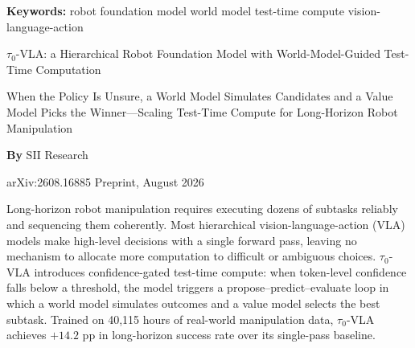 \documentclass[10pt,twocolumn]{article}
\begin{document}
\setlength{\parindent}{0pt}
\setlength{\parskip}{4pt}

{\small\color{keywordgray}\textbf{Keywords:}
  robot foundation model \textbullet{}
  world model \textbullet{}
  test-time compute \textbullet{}
  vision-language-action}\par\vspace{4pt}

{\LARGE\bfseries\raggedright
  $\tau_0$-VLA: a Hierarchical Robot Foundation
  Model with World-Model-Guided Test-Time
  Computation}\par\vspace{4pt}

{\large\itshape\raggedright
  When the Policy Is Unsure, a World Model Simulates Candidates
  and a Value Model Picks the Winner---Scaling Test-Time
  Compute for Long-Horizon Robot Manipulation}\par\vspace{6pt}

{\small\textbf{By} SII Research}\par\vspace{2pt}

{\small\color{keywordgray}arXiv:2608.16885 \textbullet{} Preprint, August 2026}
\par\vspace{2pt}\noindent{\color{rulered}\rule{\columnwidth}{0.6pt}}\vspace{6pt}

Long-horizon robot manipulation requires executing dozens of subtasks
reliably and sequencing them coherently. Most hierarchical
vision-language-action (VLA) models make high-level decisions with a
single forward pass, leaving no mechanism to allocate more computation
to difficult or ambiguous choices. $\tau_0$-VLA introduces
confidence-gated test-time compute: when token-level confidence falls
below a threshold, the model triggers a propose--predict--evaluate loop
in which a world model simulates outcomes and a value model selects
the best subtask. Trained on 40,115 hours of real-world manipulation
data, $\tau_0$-VLA achieves $+14.2$ pp in long-horizon success rate
over its single-pass baseline.
\end{document}

